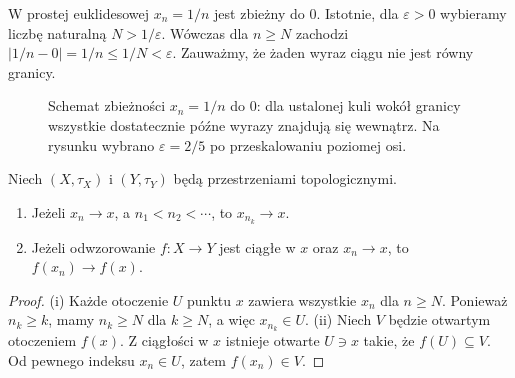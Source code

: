 \begin{przyklad}
\label{ex:topog-ciag-odwrotnosci}
W prostej euklidesowej $x_n=1/n$ jest zbieżny do $0$.
Istotnie, dla $\varepsilon>0$ wybieramy liczbę naturalną
$N>1/\varepsilon$. Wówczas dla $n\ge N$ zachodzi
$|1/n-0|=1/n\le1/N<\varepsilon$.
Zauważmy, że żaden wyraz ciągu nie jest równy granicy.
\end{przyklad}

\begin{figure}[htbp]
\centering
{}
\caption{Schemat zbieżności $x_n=1/n$ do $0$: dla ustalonej
kuli wokół granicy wszystkie dostatecznie późne wyrazy
znajdują się wewnątrz. Na rysunku wybrano
$\varepsilon=2/5$ po przeskalowaniu poziomej osi.}
\label{fig:topog-ciag-kula}
\end{figure}

\begin{stwierdzenie}
\label{prop:topog-ciag-podciag-ciaglosc}
Niech $(X,\tau_X)$ i $(Y,\tau_Y)$ będą przestrzeniami topologicznymi.
\begin{enumerate}[label=(\roman*)]
\item Jeżeli $x_n\to x$, a $n_1<n_2<\cdots$,
      to $x_{n_k}\to x$.
\item Jeżeli odwzorowanie $f\colon X\to Y$ jest ciągłe w $x$
      oraz $x_n\to x$, to $f(x_n)\to f(x)$.
\end{enumerate}
\end{stwierdzenie}
\begin{proof}
(i) Każde otoczenie $U$ punktu $x$ zawiera wszystkie $x_n$
dla $n\ge N$. Ponieważ $n_k\ge k$, mamy $n_k\ge N$
dla $k\ge N$, a więc $x_{n_k}\in U$.
(ii) Niech $V$ będzie otwartym otoczeniem $f(x)$. Z ciągłości
w $x$ istnieje otwarte $U\ni x$ takie, że $f(U)\subseteq V$.
Od pewnego indeksu $x_n\in U$, zatem $f(x_n)\in V$.
\end{proof}

